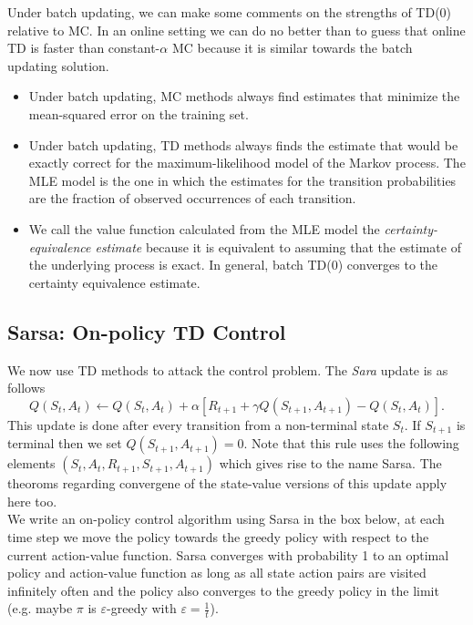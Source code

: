 Under batch updating, we can make some comments on the strengths of TD(0) relative to MC. In an online setting we can do no better than to guess that online TD is faster than constant-$\alpha$ MC because it is similar towards the batch updating solution.

\begin{itemize}
    \item Under batch updating, MC methods always find estimates that minimize the mean-squared error on the training set.
    \item Under batch updating, TD methods always finds the estimate that would be exactly correct for the maximum-likelihood model of the Markov process. The MLE model is the one in which the estimates for the transition probabilities are the fraction of observed occurrences of each transition.
    \item We call the value function calculated from the MLE model the \emph{certainty-equivalence estimate} because it is equivalent to assuming that the estimate of the underlying process is exact. In general, batch TD(0) converges to the certainty equivalence estimate.
\end{itemize}
    
\subsection{Sarsa: On-policy TD Control}
We now use TD methods to attack the control problem.  The \emph{Sara} update is as follows
\begin{equation}
    Q(S_t, A_t) \leftarrow Q(S_t, A_t) + \alpha[R_{t+1} + \gamma Q(S_{t+1}, A_{t+1}) - Q(S_t, A_t)].
\end{equation}
This update is done after every transition from a non-terminal state $S_t$. If $S_{t+1}$ is terminal then we set $Q(S_{t+1}, A_{t+1}) = 0$. Note that this rule uses the following elements $(S_t, A_t, R_{t+1}, S_{t+1}, A_{t+1})$ which gives rise to the name Sarsa. The theoroms regarding convergene of the state-value versions of this update apply here too. \\

We write an on-policy control algorithm using Sarsa in the box below, at each time step we move the policy towards the greedy policy with respect to the current action-value function. Sarsa converges with probability 1 to an optimal policy and action-value function as long as all state action pairs are visited infinitely often and the policy also converges to the greedy policy in the limit (e.g. maybe $\pi$ is $\varepsilon$-greedy with $\varepsilon=\frac1t$). \\

